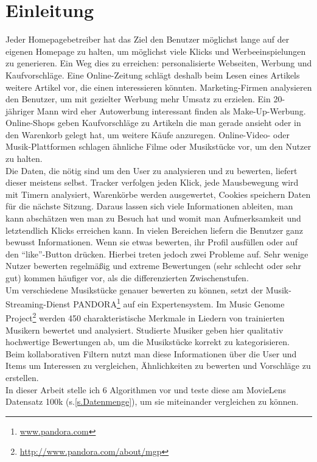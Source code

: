 \section{Einleitung}\label{s.Einleitung}\raggedbottom 
Jeder Homepagebetreiber hat das Ziel den Benutzer möglichst lange auf der eigenen Homepage zu halten, um möglichst viele Klicks und Werbeeinspielungen zu generieren. Ein Weg dies zu erreichen: personalisierte Webseiten, Werbung und Kaufvorschläge. Eine Online-Zeitung schlägt deshalb beim Lesen eines Artikels weitere Artikel vor, die einen interessieren könnten. Marketing-Firmen analysieren den Benutzer, um mit gezielter Werbung mehr Umsatz zu erzielen. Ein 20-jähriger Mann wird eher Autowerbung interessant finden als Make-Up-Werbung. Online-Shops geben Kaufvorschläge zu Artikeln die man gerade ansieht oder in den Warenkorb gelegt hat, um weitere Käufe anzuregen. Online-Video- oder Musik-Plattformen schlagen ähnliche Filme oder Musikstücke vor, um den Nutzer zu halten.\\
Die Daten, die nötig sind um den User zu analysieren und zu bewerten, liefert dieser meistens selbst. Tracker verfolgen jeden Klick, jede Mausbewegung wird mit Timern analysiert, Warenkörbe werden ausgewertet, Cookies speichern Daten für die nächste Sitzung. Daraus lassen sich viele Informationen ableiten, man kann abschätzen wen man zu Besuch hat und womit man Aufmerksamkeit und letztendlich Klicks erreichen kann. In vielen Bereichen liefern die Benutzer ganz bewusst Informationen. Wenn sie etwas bewerten, ihr Profil ausfüllen oder auf den "`like"'-Button drücken. Hierbei treten jedoch zwei Probleme auf. Sehr wenige Nutzer bewerten regelmäßig und extreme Bewertungen (sehr schlecht oder sehr gut) kommen häufiger vor, als die differenzierten Zwischenstufen.\\
Um verschiedene Musikstücke genauer bewerten zu können, setzt der Musik-Streaming-Dienst PANDORA\footnote{\url{www.pandora.com}} auf ein Expertensystem. Im Music Genome Project\footnote{\url{http://www.pandora.com/about/mgp}} werden 450 charakteristische Merkmale in Liedern von trainierten Musikern bewertet und analysiert. Studierte Musiker geben hier qualitativ hochwertige Bewertungen ab, um die Musikstücke korrekt zu kategorisieren.\\
Beim kollaborativen Filtern nutzt man diese Informationen über die User und Items um Interessen zu vergleichen, Ähnlichkeiten zu bewerten und Vorschläge zu erstellen.\\ In dieser Arbeit stelle ich 6 Algorithmen vor und teste diese am MovieLens Datensatz 100k (s.\autoref{s.Datenmenge}), um sie miteinander vergleichen zu können.

\clearpage

